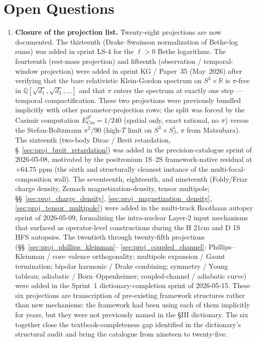 \documentclass[11pt]{article}
\begin{document}
\section{Open Questions}
\label{sec:open}

\begin{enumerate}
\setlength\itemsep{0pt}

\item \textbf{Closure of the projection list.}  Twenty-eight projections
are now documented.  The thirteenth (Drake--Swainson normalization of
Bethe-log sums) was added in sprint LS-4 for the $\ell > 0$ Bethe
logarithms.  The fourteenth (rest-mass projection) and
fifteenth (observation / temporal-window projection) were added in
sprint KG / Paper~35 (May~2026) after verifying that the bare
relativistic Klein-Gordon spectrum on $S^3 \times \mathbb{R}$ is
$\pi$-free in $\mathbb{Q}[\sqrt{d_1}, \sqrt{d_2}, \ldots]$ and that
$\pi$ enters the spectrum at exactly one step --- temporal
compactification.  These two projections were previously bundled
implicitly with other parameter-projection rows; the split was
forced by the Casimir computation $E_\text{Cas}^{S^3} = 1/240$
(spatial only, exact rational, no $\pi$) versus the Stefan-Boltzmann
$\pi^2/90$ (high-$T$ limit on $S^3 \times S^1_\beta$, $\pi$ from
Matsubara).  The sixteenth (two-body Dirac / Breit retardation,
\S~\ref{sec:proj_breit_retardation}) was added in the
precision-catalogue sprint of 2026-05-08, motivated by the
positronium 1S--2S framework-native residual at $+64.75$ ppm (the
sixth and structurally cleanest instance of the
multi-focal-composition wall).  The seventeenth, eighteenth, and
nineteenth (Foldy/Friar charge density, Zemach magnetization-density,
tensor multipole; \S\S~\ref{sec:proj_charge_density},
\ref{sec:proj_magnetization_density},
\ref{sec:proj_tensor_multipole}) were added in the multi-track
Roothaan autopsy sprint of 2026-05-09, formalizing the intra-nuclear
Layer-2 input mechanisms that surfaced as operator-level
constructions during the H 21cm and D 1S HFS autopsies.  The
twentieth through twenty-fifth projections
(\S\S~\ref{sec:proj_phillips_kleinman}--%
\ref{sec:proj_coupled_channel}: Phillips--Kleinman / core--valence
orthogonality; multipole expansion / Gaunt termination; bipolar
harmonic / Drake combining; symmetry / Young tableau; adiabatic /
Born--Oppenheimer; coupled-channel / adiabatic curve) were added in
the Sprint~1 dictionary-completion sprint of 2026-05-15.  These six
projections are transcription of pre-existing framework structures
rather than new mechanisms: the framework had been using each of them
implicitly for years, but they were not previously named in the §III
dictionary.  The six together close the textbook-completeness gap
identified in the dictionary's structural audit and bring the
catalogue from nineteen to twenty-five.


\end{enumerate}
\end{document}
